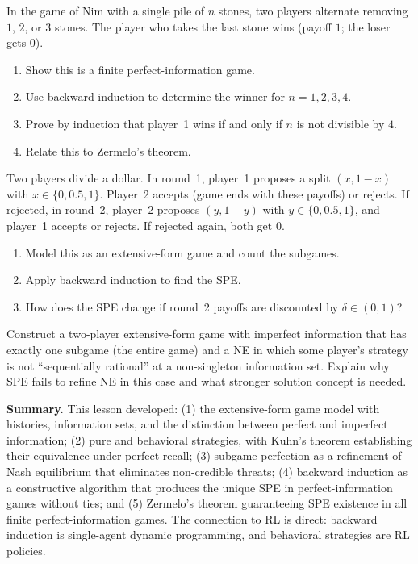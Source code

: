 \documentclass[11pt,a4paper]{article}
\begin{document}
\begin{exercise}
\label{ex:nim}
In the game of Nim with a single pile of $n$ stones, two players alternate
removing $1$, $2$, or $3$ stones. The player who takes the last stone wins
(payoff $1$; the loser gets $0$).
\begin{enumerate}[nosep,label=(\alph*)]
    \item Show this is a finite perfect-information game.
    \item Use backward induction to determine the winner for $n = 1, 2, 3, 4$.
    \item Prove by induction that player~1 wins if and only if $n$ is not
    divisible by $4$.
    \item Relate this to Zermelo's theorem.
\end{enumerate}
\end{exercise}

\begin{exercise}
\label{ex:bargaining}
Two players divide a dollar. In round~1, player~1 proposes a split
$(x, 1-x)$ with $x \in \{0, 0.5, 1\}$. Player~2 accepts (game ends with
these payoffs) or rejects. If rejected, in round~2, player~2 proposes
$(y, 1-y)$ with $y \in \{0, 0.5, 1\}$, and player~1 accepts or rejects.
If rejected again, both get $0$.
\begin{enumerate}[nosep,label=(\alph*)]
    \item Model this as an extensive-form game and count the subgames.
    \item Apply backward induction to find the SPE.
    \item How does the SPE change if round~2 payoffs are discounted by
    $\delta \in (0,1)$?
\end{enumerate}
\end{exercise}

\begin{exercise}
\label{ex:spe_imperfect}
Construct a two-player extensive-form game with imperfect information that
has exactly one subgame (the entire game) and a NE in which some player's
strategy is not ``sequentially rational'' at a non-singleton information set.
Explain why SPE fails to refine NE in this case and what stronger solution
concept is needed.
\end{exercise}

\bigskip

\noindent\textbf{Summary.} This lesson developed: (1) the extensive-form
game model with histories, information sets, and the distinction between
perfect and imperfect information; (2) pure and behavioral strategies, with
Kuhn's theorem establishing their equivalence under perfect recall; (3)
subgame perfection as a refinement of Nash equilibrium that eliminates
non-credible threats; (4) backward induction as a constructive algorithm
that produces the unique SPE in perfect-information games without ties; and
(5) Zermelo's theorem guaranteeing SPE existence in all finite
perfect-information games. The connection to RL is direct: backward induction
is single-agent dynamic programming, and behavioral strategies are RL
policies.

\bigskip

\end{document}
